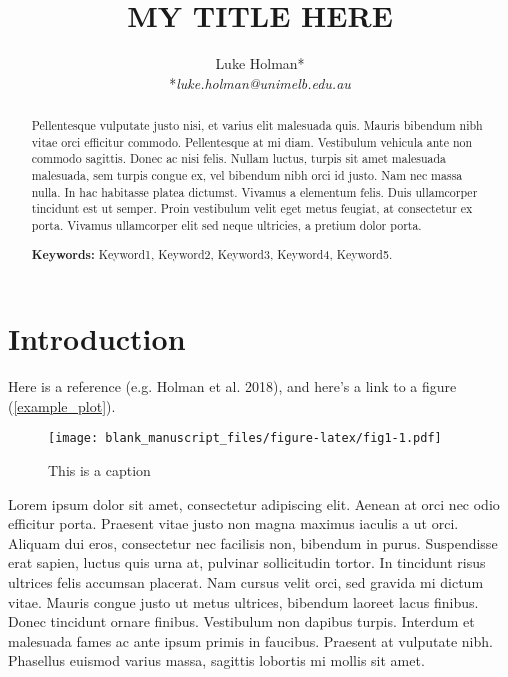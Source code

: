 \documentclass[12pt,]{article}
\title{MY TITLE HERE}
\author{Luke Holman* \\ *\textit{luke.holman@unimelb.edu.au} \vspace{5mm}}
\date{}
\begin{document}
\maketitle
\begin{abstract}
Pellentesque vulputate justo nisi, et varius elit malesuada quis. Mauris
bibendum nibh vitae orci efficitur commodo. Pellentesque at mi diam.
Vestibulum vehicula ante non commodo sagittis. Donec ac nisi felis.
Nullam luctus, turpis sit amet malesuada malesuada, sem turpis congue
ex, vel bibendum nibh orci id justo. Nam nec massa nulla. In hac
habitasse platea dictumst. Vivamus a elementum felis. Duis ullamcorper
tincidunt est ut semper. Proin vestibulum velit eget metus feugiat, at
consectetur ex porta. Vivamus ullamcorper elit sed neque ultricies, a
pretium dolor porta. \vspace{5mm}\par\noindent\textbf{Keywords:}
Keyword1, Keyword2, Keyword3, Keyword4, Keyword5.
\end{abstract}

\maketitle


\newpage

\section{Introduction}\label{introduction}

Here is a reference (e.g. Holman et al. 2018), and here's a link to a
figure (\autoref{example_plot}).

\begin{figure}[htbp]
\centering
\texttt{[image: blank\_manuscript\_files/figure-latex/fig1-1.pdf]}
\caption{\label{example_plot}This is a caption}
\end{figure}

Lorem ipsum dolor sit amet, consectetur adipiscing elit. Aenean at orci
nec odio efficitur porta. Praesent vitae justo non magna maximus iaculis
a ut orci. Aliquam dui eros, consectetur nec facilisis non, bibendum in
purus. Suspendisse erat sapien, luctus quis urna at, pulvinar
sollicitudin tortor. In tincidunt risus ultrices felis accumsan
placerat. Nam cursus velit orci, sed gravida mi dictum vitae. Mauris
congue justo ut metus ultrices, bibendum laoreet lacus finibus. Donec
tincidunt ornare finibus. Vestibulum non dapibus turpis. Interdum et
malesuada fames ac ante ipsum primis in faucibus. Praesent at vulputate
nibh. Phasellus euismod varius massa, sagittis lobortis mi mollis sit
amet.
\end{document}

